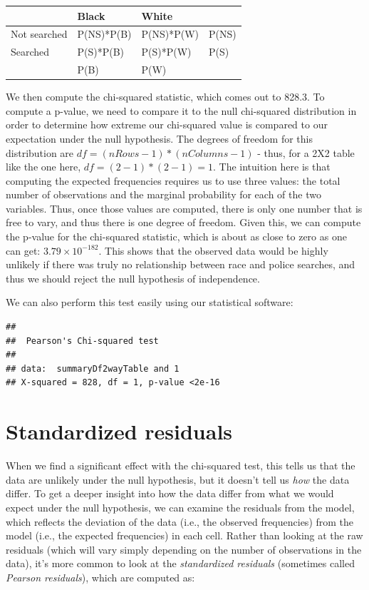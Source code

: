 \documentclass[12pt,]{book}
\theoremstyle{definition}
\theoremstyle{definition}
\theoremstyle{definition}
\theoremstyle{remark}
\begin{document}
\begin{longtable}[]{@{}llll@{}}
\toprule
& Black & White &\tabularnewline
\midrule
\endhead
Not searched & P(NS)*P(B) & P(NS)*P(W) & P(NS)\tabularnewline
Searched & P(S)*P(B) & P(S)*P(W) & P(S)\tabularnewline
& P(B) & P(W) &\tabularnewline
\bottomrule
\end{longtable}

We then compute the chi-squared statistic, which comes out to 828.3.
To compute a p-value, we need to compare it to the null chi-squared distribution in order to determine how extreme our chi-squared value is compared to our expectation under the null hypothesis. The degrees of freedom for this distribution are \(df = (nRows - 1) * (nColumns - 1)\) - thus, for a 2X2 table like the one here, \(df = (2-1)*(2-1)=1\). The intuition here is that computing the expected frequencies requires us to use three values: the total number of observations and the marginal probability for each of the two variables. Thus, once those values are computed, there is only one number that is free to vary, and thus there is one degree of freedom. Given this, we can compute the p-value for the chi-squared statistic, which is about as close to zero as one can get: \(3.79 \times 10^{-182}\). This shows that the observed data would be highly unlikely if there was truly no relationship between race and police searches, and thus we should reject the null hypothesis of independence.

We can also perform this test easily using our statistical software:

\begin{verbatim}
## 
##  Pearson's Chi-squared test
## 
## data:  summaryDf2wayTable and 1
## X-squared = 828, df = 1, p-value <2e-16
\end{verbatim}

\hypertarget{standardized-residuals}{%
\section{Standardized residuals}\label{standardized-residuals}}

When we find a significant effect with the chi-squared test, this tells us that the data are unlikely under the null hypothesis, but it doesn't tell us \emph{how} the data differ. To get a deeper insight into how the data differ from what we would expect under the null hypothesis, we can examine the residuals from the model, which reflects the deviation of the data (i.e., the observed frequencies) from the model (i.e., the expected frequencies) in each cell. Rather than looking at the raw residuals (which will vary simply depending on the number of observations in the data), it's more common to look at the \emph{standardized residuals} (sometimes called \emph{Pearson residuals}), which are computed as:
\end{document}
